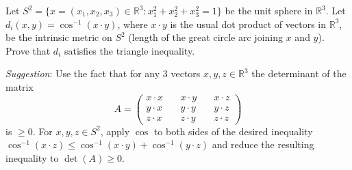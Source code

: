 \documentclass{jhwhw}
\begin{document}
\problem{}%
Let $S^2 = \{x = (x_1,x_2,x_3)\in\mathbb{R}^3 : x_1^2 + x_2^2 + x_3^2  = 1\}$ be the unit sphere  in $\mathbb{R}^3$.  Let $d_i(x,y) = \cos^{-1}(x\cdot y)$, where $x\cdot y$ is the usual dot product of vectors in $\mathbb{R}^3$, be the intrinsic metric on $S^2$ (length of the great circle arc joining $x$ and $y$).    Prove that $d_i$ satisfies the triangle inequality.

\noindent\emph{Suggestion}: Use the fact that for any 3 vectors $x,y,z\in\mathbb{R}^3$ the determinant of the matrix
$$
A = 
\left( \begin{array}{ccccc}
x\cdot x &\ & x\cdot y &\ & x\cdot z \\
y\cdot x &\ & y\cdot y &\ & y\cdot z \\
z\cdot x &\ & z\cdot y &\ & z\cdot z 
\end{array} \right)
$$
is $\ge 0$.   For $x,y,z\in S^2$, apply $\cos$ to both sides of the desired inequality  $\cos^{-1}(x\cdot z) \le \cos^{-1}(x\cdot y) + \cos^{-1}(y\cdot z)$ and reduce the resulting inequality to  $\det(A)\ge 0$.
\solution{}
\end{document}
